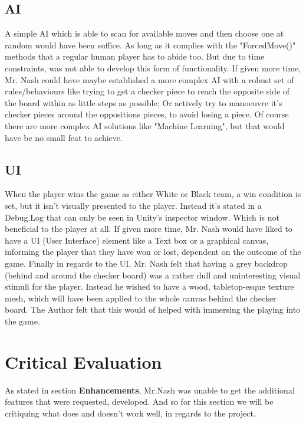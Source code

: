 \documentclass[10pt, a4paper]{article}
\begin{document}
	 \subsection{AI}
	 A simple AI which is able to scan for available moves and then choose one at random would have been suffice. As long as it complies with the "ForcedMove()" methods that a regular human player has to abide too. But due to time constraints, was not able to develop this form of functionality. If given more time, Mr. Nash could have maybe established a more complex AI with a robust set of rules/behaviours like trying to get a checker piece to reach the opposite side of the board within as little steps as possible; Or actively try to manoeuvre it's checker pieces around the oppositions pieces, to avoid losing a piece. Of course there are more complex AI solutions like "Machine Learning", but that would have be no small feat to achieve.
	 
	 \subsection{UI}
	 When the player wins the game as either White or Black team, a win condition is set, but it isn't visually presented to the player. Instead it's stated in a Debug.Log that can only be seen in Unity's inspector window. Which is not beneficial to the player at all. If given more time, Mr. Nash would have liked to have a UI (User Interface) element like a Text box or a graphical canvas, informing the player that they have won or lost, dependent on the outcome of the game. Finally in regards to the UI, Mr. Nash felt that having a grey backdrop (behind and around the checker board) was a rather dull and uninteresting visual stimuli for the player. Instead he wished to have a wood, tabletop-esque texture mesh, which will have been applied to the whole canvas behind the checker board. The Author felt that this would of helped with immersing the playing into the game. 
	 
	 \section{Critical Evaluation}
	 As stated in section \textbf{Enhancements}, Mr.Nash was unable to get the additional features that were requested, developed. And so for this section we will be critiquing what does and doesn't work well, in regards to the project.
	 
\end{document}
